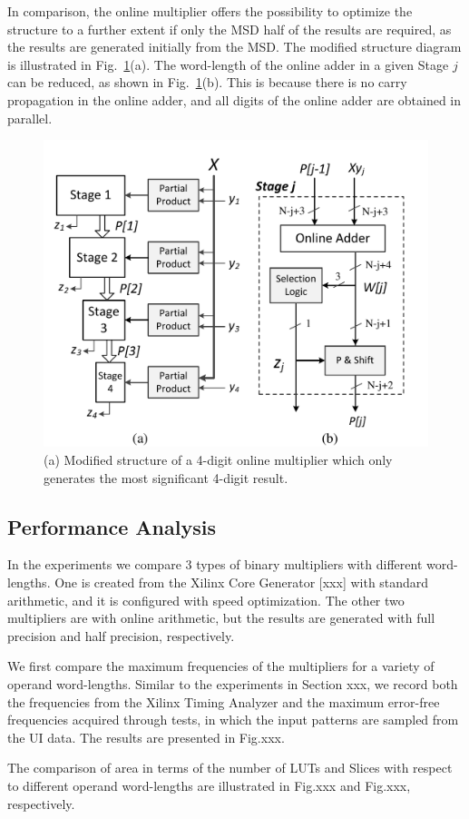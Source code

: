 \documentclass[conference]{IEEEtran}
\begin{document}
In comparison, the online multiplier offers the possibility to optimize the structure to a further extent if only the MSD half of the results are required, as the results are generated initially from the MSD. The modified structure diagram is illustrated in Fig.~\ref{Fig:PMStructure_MSDhalf}(a). The word-length of the online adder in a given Stage $j$ can be reduced, as shown in Fig.~\ref{Fig:PMStructure_MSDhalf}(b). This is because there is no carry propagation in the online adder, and all digits of the online adder are obtained in parallel.

\begin{figure}[tbp]
	\centering
	\includegraphics[width=.5\textwidth]{./Figures/ParallelMult_MSDhalf.pdf}
	\caption{(a) Modified structure of a 4-digit online multiplier which only generates the most significant 4-digit result. }
	\label{Fig:PMStructure_MSDhalf}
\end{figure}

\subsection{Performance Analysis}
In the experiments we compare 3 types of binary multipliers with different word-lengths. One is created from the Xilinx Core Generator [xxx] with standard arithmetic, and it is configured with speed optimization. The other two multipliers are with online arithmetic, but the results are generated with full precision and half precision, respectively. 

We first compare the maximum frequencies of the multipliers for a variety of operand word-lengths. Similar to the experiments in Section xxx, we record both the frequencies from the Xilinx Timing Analyzer and the maximum error-free frequencies acquired through tests, in which the input patterns are sampled from the UI data. The results are presented in Fig.xxx.



The comparison of area in terms of the number of LUTs and Slices with respect to different operand word-lengths are illustrated in Fig.xxx and Fig.xxx, respectively. 
\end{document}
